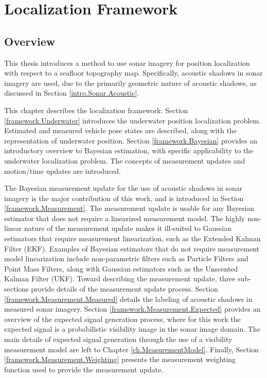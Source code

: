 
\chapter{Localization Framework}
\label{ch.Framework}

\section{Overview}
\label{framework.Overview}

This thesis introduces a method to use sonar imagery for position localization with respect to a seafloor topography map.
Specifically, acoustic shadows in sonar imagery are used, due to the primarily geometric nature of acoustic shadows, as discussed in Section \ref{intro.Sonar.Acoustic}.

This chapter describes the localization framework.  
Section \ref{framework.Underwater} introduces the underwater position localization problem.  
Estimated and measured vehicle pose states are described, along with the representation of underwater position. Section \ref{framework.Bayesian} provides an introductory overview to Bayesian estimation, with specific applicability to the underwater localization problem.  
The concepts of measurement updates and motion/time updates are introduced.  

The Bayesian measurement update for the use of acoustic shadows in sonar imagery is the major contribution of this work, and is introduced in Section \ref{framework.Measurement}.
The measurement update is usable for any Bayesian estimator that does not require a linearized measurement model. 
The highly non-linear nature of the measurement update makes it ill-suited to Gaussian estimators that require measurement linearization, such as the Extended Kalman Filter (EKF).
Examples of Bayesian estimators that do not require measurement model linearization include non-parametric filters such as Particle Filters and Point Mass Filters, along with Gaussian estimators such as the Unscented Kalman Filter (UKF).
Toward describing the measurement update, three sub-sections provide details of the measurement update process.
Section \ref{framework.Measurement.Measured} details the labeling of acoustic shadows in measured sonar imagery.
Section \ref{framework.Measurement.Expected} provides an overview of the expected signal generation process, where for this work the expected signal is a probabilistic visibility image in the sonar image domain.
The main details of expected signal generation through the use of a visibility measurement model are left to Chapter \ref{ch.MeasurementModel}.
Finally, Section \ref{framework.Measurement.Weighting} presents the measurement weighting function used to provide the measurement update.


